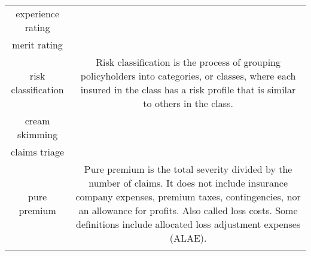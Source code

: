 \documentclass[]{book}
\theoremstyle{definition}
\theoremstyle{definition}
\theoremstyle{definition}
\theoremstyle{remark}
\begin{document}
\begin{longtable}[]{@{}cc@{}}
\begin{minipage}[t]{0.39\columnwidth}\centering\strut
experience rating\strut
\end{minipage} & \begin{minipage}[t]{0.42\columnwidth}\centering\strut
\strut
\end{minipage}\tabularnewline
\begin{minipage}[t]{0.39\columnwidth}\centering\strut
merit rating\strut
\end{minipage} & \begin{minipage}[t]{0.42\columnwidth}\centering\strut
\strut
\end{minipage}\tabularnewline
\begin{minipage}[t]{0.39\columnwidth}\centering\strut
risk classification\strut
\end{minipage} & \begin{minipage}[t]{0.42\columnwidth}\centering\strut
Risk classification is the process of grouping policyholders into
categories, or classes, where each insured in the class has a risk
profile that is similar to others in the class.\strut
\end{minipage}\tabularnewline
\begin{minipage}[t]{0.39\columnwidth}\centering\strut
cream skimming\strut
\end{minipage} & \begin{minipage}[t]{0.42\columnwidth}\centering\strut
\strut
\end{minipage}\tabularnewline
\begin{minipage}[t]{0.39\columnwidth}\centering\strut
claims triage\strut
\end{minipage} & \begin{minipage}[t]{0.42\columnwidth}\centering\strut
\strut
\end{minipage}\tabularnewline
\begin{minipage}[t]{0.39\columnwidth}\centering\strut
pure premium\strut
\end{minipage} & \begin{minipage}[t]{0.42\columnwidth}\centering\strut
Pure premium is the total severity divided by the number of claims. It
does not include insurance company expenses, premium taxes,
contingencies, nor an allowance for profits. Also called loss costs.
Some definitions include allocated loss adjustment expenses
(ALAE).\strut
\end{minipage}\tabularnewline
\begin{minipage}[t]{0.39\columnwidth}\centering\strut

\end{minipage}
\end{longtable}
\end{document}
